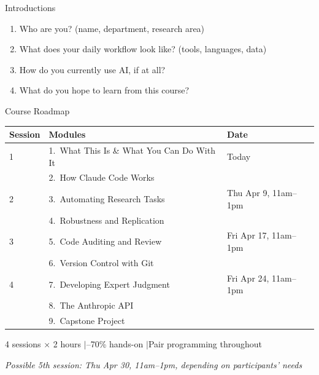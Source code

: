 \documentclass[aspectratio=169, 11pt]{beamer}
\begin{document}
\begin{frame}{Introductions}
  \begin{enumerate}
    \item Who are you? {\small (name, department, research area)}
    \item What does your daily workflow look like? {\small (tools, languages, data)}
    \item How do you currently use AI, if at all?
    \item What do you hope to learn from this course?
  \end{enumerate}
\end{frame}

\begin{frame}{Course Roadmap}
  \small
  \begin{tabular}{@{}l l l@{}}
    \toprule
    \textbf{Session} & \textbf{Modules} & \textbf{Date} \\
    \midrule
    1 & 1.\ What This Is \& What You Can Do With It & Today \\
      & 2.\ How Claude Code Works & \\
    \midrule
    2 & 3.\ Automating Research Tasks & Thu Apr 9, 11am--1pm \\
      & 4.\ Robustness and Replication & \\
    \midrule
    3 & 5.\ Code Auditing and Review & Fri Apr 17, 11am--1pm \\
      & 6.\ Version Control with Git & \\
    \midrule
    4 & 7.\ Developing Expert Judgment & Fri Apr 24, 11am--1pm \\
      & 8.\ The Anthropic API & \\
      & 9.\ Capstone Project & \\
    \bottomrule
  \end{tabular}

  \vspace{0.5em}
  {\footnotesize 4 sessions $\times$ 2 hours \quad$\vert$--70\% hands-on \quad$\vert$\quad Pair programming throughout}

  \vspace{0.3em}
  {\footnotesize \textit{Possible 5th session: Thu Apr 30, 11am--1pm, depending on participants' needs}}
\end{frame}
\end{document}
